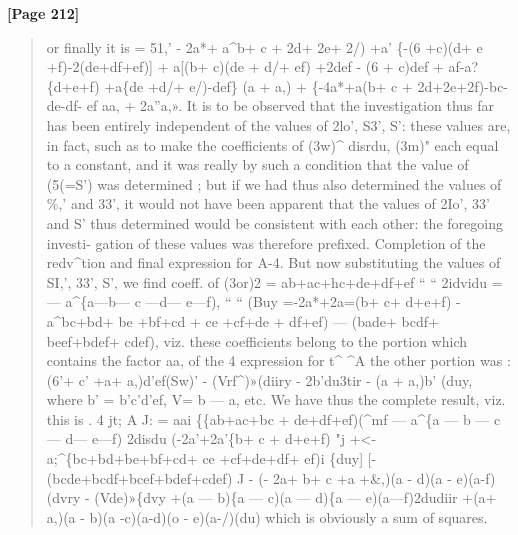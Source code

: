 \documentclass[11pt,a4paper]{book}
\begin{document}
\textbf{[Page 212]}\\[0.2cm]
\begin{quote}
or finally it is
= 51,' - 2a*+ a\textasciicircum{}b+ c + 2d+ 2e+ 2/) +a' \{-(6 +c)(d+ e +f)-2(de+df+ef)]
+ a[(b+ c)(de + d/+ ef) +2def - (6 + c)def
+ af-a?\{d+e+f) +a\{de +d/+ e/)-def\} (a + a,)
+ \{-4a*+a(b+ c + 2d+2e+2f)-bc-de-df- ef aa,
+
2a''a,».
It is to be observed that the investigation thus far has been entirely independent of
the values of 2lo', S3', S': these values are, in fact, such as to make the coefficients
of (3w)\textasciicircum{} disrdu, (3m)" each equal to a constant, and it was really by such a condition
that the value of (5(=S') was determined ; but if we had thus also determined the
values of \%,' and 33', it would not have been apparent that the values of 2Io', 33'
and S' thus determined would be consistent with each other: the foregoing investi-
gation of these values was therefore prefixed.
Completion of the redv\textasciicircum{}tion and final expression for A-4.
But now substituting the values of SI,', 33', S', we find
coeff. of (3or)2 = ab+ac+hc+de+df+ef
`` `` 2idvidu
=--- a\textasciicircum{}\{a---b---
c
---d---
e---f),
`` `` (Buy =-2a*+2a=(b+ c+ d+e+f)
-a\textasciicircum{}bc+bd+ be +bf+cd + ce +cf+de + df+ef)
--- (bade+ bcdf+ beef+bdef+ cdef),
viz. these coefficients belong to the portion which contains the factor aa, of the
4
expression for t\textasciicircum{} \textasciicircum{}A the other portion was
:
(6'+ c' +a+ a,)d'ef(Sw)' - (Vrf\textasciicircum{})»(diiry - 2b'du3tir - (a + a,)b' (duy,
where
b'
=
b'c'd'ef,
V=
b
---
a, etc.
We
have thus the complete result, viz. this is
.
4
jt; A J: = aai \{\{ab+ac+bc + de+df+ef)(\textasciicircum{}mf
---
a\textasciicircum{}\{a
---
b
---
c
--- d---
e---f) 2disdu
(-2a'+2a'\{b+ c + d+e+f)
"j
+<-a;\textasciicircum{}\{bc+bd+be+bf+cd+ ce +cf+de+df+ ef)i \{duy]
[-(bcde+bcdf+bcef+bdef+cdef)
J
- (- 2a+ b+ c +a +\&,)(a - d)(a - e)(a-f)(dvry - (Vde)»\{dvy
+(a --- b)\{a --- c)(a --- d)\{a --- e)(a---f)2dudiir
+(a+ a,)(a - b)(a -c)(a-d)(o - e)(a-/)(du)
which is obviously a sum of squares.
\end{quote}
\end{document}
